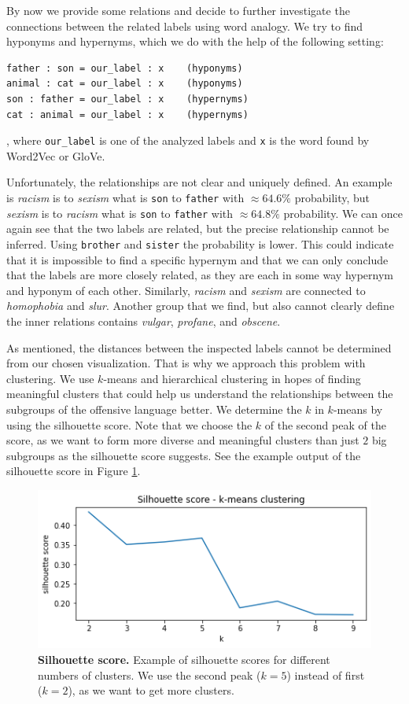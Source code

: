 \documentclass[fleqn,moreauthors,10pt]{ds_report}
\begin{document}
By now we provide some relations and decide to further investigate the connections between the related labels using word analogy. We try to find hyponyms and hypernyms, which we do with the help of the following setting:
\begin{verbatim}
father : son = our_label : x 	(hyponyms)
animal : cat = our_label : x 	(hyponyms)
son : father = our_label : x 	(hypernyms)
cat : animal = our_label : x 	(hypernyms)
\end{verbatim},
where \texttt{our\_label} is one of the analyzed labels and \texttt{x} is the word found by Word2Vec or GloVe. 

Unfortunately, the relationships are not clear and uniquely defined. An example is \textit{racism} is to \textit{sexism} what is \texttt{son} to \texttt{father} with $\approx 64.6\%$ probability, but \textit{sexism} is to \textit{racism} what is \texttt{son} to \texttt{father} with $\approx 64.8\%$ probability. We can once again see that the two labels are related, but the precise relationship cannot be inferred. Using \texttt{brother} and \texttt{sister} the probability is lower. This could indicate that it is impossible to find a specific hypernym and that we can only conclude that the labels are more closely related, as they are each in some way hypernym and hyponym of each other. Similarly, \textit{racism} and \textit{sexism} are connected to \textit{homophobia} and \textit{slur}. Another group that we find, but also cannot clearly define the inner relations contains \textit{vulgar}, \textit{profane}, and \textit{obscene}.

As mentioned, the distances between the inspected labels cannot be determined from our chosen visualization. That is why we approach this problem with clustering. We use $k$-means and hierarchical clustering in hopes of finding meaningful clusters that could help us understand the relationships between the subgroups of the offensive language better. We determine the $k$ in $k$-means by using the silhouette score. Note that we choose the $k$ of the second peak of the score, as we want to form more diverse and meaningful clusters than just $2$ big subgroups as the silhouette score suggests. See the example output of the silhouette score in Figure \ref{fig:silh}.

\begin{figure}[htb]\centering
	\includegraphics[width=\linewidth]{silh.png}
	\caption{\textbf{Silhouette score.} Example of silhouette scores for different numbers of clusters. We use the second peak ($k = 5$) instead of first ($k = 2$), as we want to get more clusters.}
	\label{fig:silh}
\end{figure}
\end{document}

